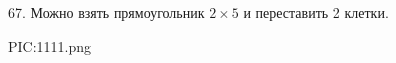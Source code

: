 67. Можно взять прямоугольник $2\times5$ и переставить 2 клетки.
\begin{center}
{{PIC:1111.png}}
\end{center}
